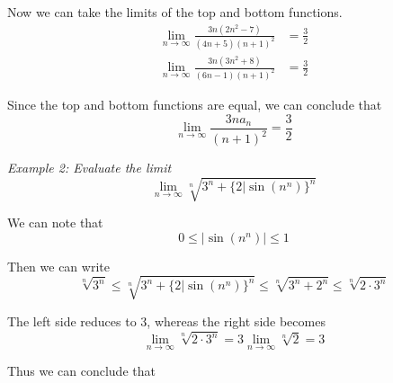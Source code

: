 \documentclass{article}
\begin{document}
            \noindent Now we can take the limits of the top and bottom functions. \\

            \begin{align*}
                \lim_{n\to \infty}\frac{3n(2n^2-7)}{(4n+5)(n+1)^2} &= \frac{3}{2} \\
                \lim_{n\to\infty}\frac{3n(3n^2+8)}{(6n-1)(n+1)^2} &= \frac{3}{2}
            \end{align*}

            \noindent Since the top and bottom functions are equal, we can conclude that \\

            \begin{equation*}
                \lim_{n\to\infty} \frac{3na_n}{(n+1)^2}=\frac{3}{2}
            \end{equation*}

            \noindent \color{blue} \textit{Example 2: Evaluate the limit} \\

            \begin{equation*}
                \lim_{n\to\infty}\sqrt[n]{3^n+\{2|\sin{(n^n)}\}^n}
            \end{equation*}

            \color{black} \noindent We can note that \\

            \begin{equation*}
                0\leq|\sin{(n^n)}|\leq1
            \end{equation*}

            \noindent Then we can write \\

            \begin{equation*}
                \sqrt[n]{3^n}\leq\sqrt[n]{3^n+\{2|\sin{(n^n)}\}^n}\leq\sqrt[n]{3^n+2^n}\leq\sqrt[n]{2\cdot3^n}
            \end{equation*}

            \noindent The left side reduces to 3, whereas the right side becomes \\

            \begin{equation*}
                \lim_{n\to\infty}\sqrt[n]{2\cdot3^n} = 3\lim_{n\to\infty}\sqrt[n]{2}=3
            \end{equation*}

            \noindent Thus we can conclude that \\
\end{document}
